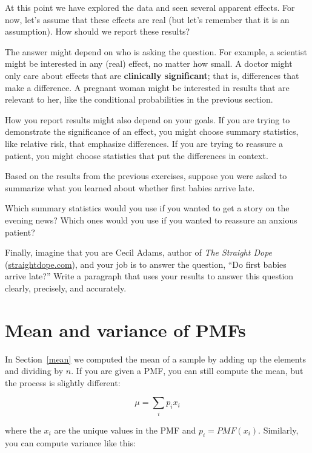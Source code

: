 \documentclass[12pt]{book}
\begin{document}
At this point we have explored the data and seen several apparent
effects.  For now, let's assume that these effects are real (but let's
remember that it is an assumption).  How should we report these
results?

The answer might depend on who is asking the question.  For example,
a scientist might be interested in any (real) effect, no matter how
small.  A doctor might only care about effects that are
{\bf clinically significant}; that is, differences that make a difference.
A pregnant woman might be interested in results that are relevant to
her, like the conditional probabilities in the previous section.

How you report results might also depend on your goals.  If you are
trying to demonstrate the significance of an effect, you might choose
summary statistics, like relative risk, that emphasize differences.
If you are trying to reassure a patient, you might choose statistics
that put the differences in context.

\begin{ex}

Based on the results from the previous exercises, suppose you were
asked to summarize what you learned about whether first
babies arrive late.

Which summary statistics would you use if you wanted to get a story
on the evening news?  Which ones would you use if you wanted to
reassure an anxious patient?

Finally, imagine that you are Cecil Adams, author of {\it The Straight
  Dope} (\url{straightdope.com}), and your job is to answer the
question, ``Do first babies arrive late?''  Write a paragraph that
uses your results to answer this question clearly, precisely, and
accurately.

\end{ex}


\section{Mean and variance of PMFs}

In Section~\ref{mean} we computed the mean of a sample by adding up
the elements and dividing by $n$.  If you are given a PMF, you can
still compute the mean, but the process is slightly different:

\[ \mu = \sum_i p_i x_i \]

where the $x_i$ are the unique values in the PMF and $p_i = PMF(x_i)$.
Similarly, you can compute variance like this:
\end{document}
